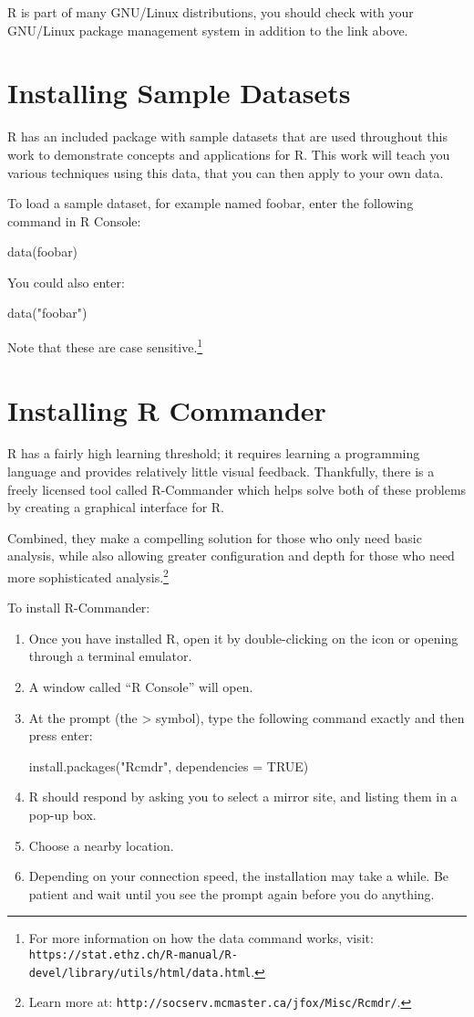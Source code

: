 R is part of many GNU/Linux distributions, you should check with your GNU/Linux package management system in addition to the link above.

\section{Installing Sample Datasets}
R has an included package with sample datasets that are used throughout this work to demonstrate concepts and applications for R. This work will teach you various techniques using this data, that you can then apply to your own data.

To load a sample dataset, for example named foobar, enter the following command in R Console:

 data(foobar)

You could also enter:

 data("foobar")

Note that these are case sensitive.\footnote{For more information on how the data command works, visit: \texttt{https://stat.ethz.ch/R-manual/R-devel/library/utils/html/data.html}.}

\section{Installing R Commander}
R has a fairly high learning threshold; it requires learning a programming language and provides relatively little visual feedback. Thankfully, there is a freely licensed tool called R-Commander which helps solve both of these problems by creating a graphical interface for R.

Combined, they make a compelling solution for those who only need basic analysis, while also allowing greater configuration and depth for those who need more sophisticated analysis.\footnote{Learn more at: \texttt{http://socserv.mcmaster.ca/jfox/Misc/Rcmdr/}.}

To install R-Commander:

\begin{enumerate}
 \item Once you have installed R, open it by double-clicking on the icon or opening through a terminal emulator.
 \item A window called “R Console” will open.
 \item At the prompt (the > symbol), type the following command exactly and then press enter:

install.packages("Rcmdr", dependencies = TRUE)

 \item R should respond by asking you to select a mirror site, and listing them in a pop-up box.
 \item Choose a nearby location.
 \item Depending on your connection speed, the installation may take a while. Be patient and wait until you see the prompt again before you do anything.
 \end{enumerate}
 
